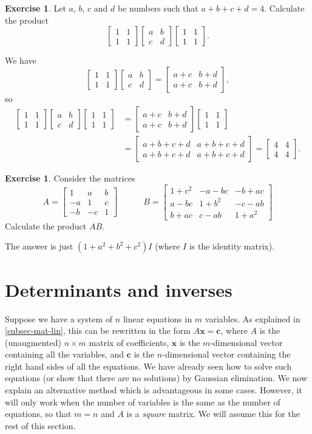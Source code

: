 \documentclass[a4paper]{book}
\newcommand{\RED}[1]{{\color{red}#1}}
\newcommand{\bbm}       {\begin{bmatrix}}
\newcommand{\ebm}       {\end{bmatrix}}
\newcommand{\tm}        {\times}
\newcommand{\VEC}[1]    {\mathbf{#1}}
\renewcommand{\:}{\colon}
\newcommand{\EMPH}[1]{\RED{\emph{#1}}}
\theoremstyle{definition}
\newtheorem{exercise}[theorem]{Exercise}
\renewenvironment{solution}{\SolutionInline}{\endSolutionInline}
\begin{document}
\begin{exercise}
 Let $a$, $b$, $c$ and $d$ be numbers such that $a+b+c+d=4$.
 Calculate the product
 \[ \bbm 1&1\\1&1\ebm \bbm a&b\\c&d\ebm \bbm 1&1\\1&1\ebm. \]
\end{exercise}
\begin{solution}
 We have 
 \[ \bbm 1&1\\1&1\ebm \bbm a&b\\c&d\ebm = 
     \bbm a+c&b+d\\a+c&b+d\ebm, 
 \]
 so 
 \begin{align*}
  \bbm 1&1\\1&1\ebm \bbm a&b\\c&d\ebm\bbm 1&1\\1&1\ebm 
   &= \bbm a+c&b+d\\a+c&b+d\ebm\bbm 1&1\\1&1\ebm \\
   &= \bbm a+b+c+d & a+b+c+d \\ 
           a+b+c+d & a+b+c+d \ebm = \bbm 4&4\\4&4 \ebm.
 \end{align*}
\end{solution}

\begin{exercise}
 Consider the matrices
 \[ A = \bbm
          1   & a   & b   \\
          -a  & 1   & c   \\
          -b  & -c  & 1
        \ebm
    \hspace{3em}
    B = \bbm
          1+c^2 & -a-bc & -b+ac \\
          a-bc  & 1+b^2 & -c-ab \\
          b+ac  & c-ab  & 1+a^2
        \ebm
 \]
 Calculate the product $AB$.
\end{exercise}
\begin{solution}
 The answer is just $(1+a^2+b^2+c^2)I$ (where $I$ is the identity
 matrix).
\end{solution}


\section{Determinants and inverses}
\label{sec-det}

Suppose we have a system of $n$ linear equations in $m$ variables.  As
explained in \autoref{subsec-mat-lin}, this can be rewritten in the
form $A\VEC{x}=\VEC{c}$, where $A$ is the (unaugmented) $n\tm m$
matrix of coefficients, $\VEC{x}$ is the $m$-dimensional vector
containing all the variables, and $\VEC{c}$ is the $n$-dimensional
vector containing the right hand sides of all the equations.  We have
already seen how to solve such equations (or show that there are no
solutions) by Gaussian elimination.  We now explain an alternative
method which is advantageous in some cases.  However, it will only
work when the number of variables is the same as the number of
equations, so that $m=n$ and $A$ is a \EMPH{square} matrix.  We will
assume this for the rest of this section.
\end{document}

